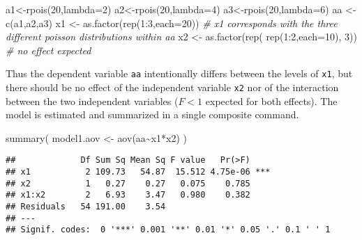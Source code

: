 \documentclass[
]{book}
\newenvironment{Shaded}{\begin{snugshade}}{\end{snugshade}}
\newcommand{\AttributeTok}[1]{\textcolor[rgb]{0.77,0.63,0.00}{#1}}
\newcommand{\CommentTok}[1]{\textcolor[rgb]{0.56,0.35,0.01}{\textit{#1}}}
\newcommand{\DecValTok}[1]{\textcolor[rgb]{0.00,0.00,0.81}{#1}}
\newcommand{\FunctionTok}[1]{\textcolor[rgb]{0.00,0.00,0.00}{#1}}
\newcommand{\NormalTok}[1]{#1}
\newcommand{\OtherTok}[1]{\textcolor[rgb]{0.56,0.35,0.01}{#1}}
\newcommand{\SpecialCharTok}[1]{\textcolor[rgb]{0.00,0.00,0.00}{#1}}
\begin{document}
\begin{Shaded}
\begin{Highlighting}[]
\NormalTok{a1}\OtherTok{\textless{}{-}}\FunctionTok{rpois}\NormalTok{(}\DecValTok{20}\NormalTok{,}\AttributeTok{lambda=}\DecValTok{2}\NormalTok{)}
\NormalTok{a2}\OtherTok{\textless{}{-}}\FunctionTok{rpois}\NormalTok{(}\DecValTok{20}\NormalTok{,}\AttributeTok{lambda=}\DecValTok{4}\NormalTok{) }
\NormalTok{a3}\OtherTok{\textless{}{-}}\FunctionTok{rpois}\NormalTok{(}\DecValTok{20}\NormalTok{,}\AttributeTok{lambda=}\DecValTok{6}\NormalTok{) }
\NormalTok{aa }\OtherTok{\textless{}{-}} \FunctionTok{c}\NormalTok{(a1,a2,a3) }
\NormalTok{x1 }\OtherTok{\textless{}{-}} \FunctionTok{as.factor}\NormalTok{(}\FunctionTok{rep}\NormalTok{(}\DecValTok{1}\SpecialCharTok{:}\DecValTok{3}\NormalTok{,}\AttributeTok{each=}\DecValTok{20}\NormalTok{)) }
\CommentTok{\# x1 corresponds with the three different poisson distributions within aa}
\NormalTok{x2 }\OtherTok{\textless{}{-}} \FunctionTok{as.factor}\NormalTok{(}\FunctionTok{rep}\NormalTok{( }\FunctionTok{rep}\NormalTok{(}\DecValTok{1}\SpecialCharTok{:}\DecValTok{2}\NormalTok{,}\AttributeTok{each=}\DecValTok{10}\NormalTok{), }\DecValTok{3}\NormalTok{)) }\CommentTok{\# no effect expected}
\end{Highlighting}
\end{Shaded}

Thus the dependent variable \texttt{aa} intentionally differs between the levels of \texttt{x1}, but there should be no effect of the independent variable \texttt{x2} nor of the interaction between the two independent variables (\(F<1\) expected for both effects). The model is estimated and summarized in a single composite command.

\begin{Shaded}
\begin{Highlighting}[]
\FunctionTok{summary}\NormalTok{( model1.aov }\OtherTok{\textless{}{-}} \FunctionTok{aov}\NormalTok{(aa}\SpecialCharTok{\textasciitilde{}}\NormalTok{x1}\SpecialCharTok{*}\NormalTok{x2) )}
\end{Highlighting}
\end{Shaded}

\begin{verbatim}
##             Df Sum Sq Mean Sq F value   Pr(>F)    
## x1           2 109.73   54.87  15.512 4.75e-06 ***
## x2           1   0.27    0.27   0.075    0.785    
## x1:x2        2   6.93    3.47   0.980    0.382    
## Residuals   54 191.00    3.54                     
## ---
## Signif. codes:  0 '***' 0.001 '**' 0.01 '*' 0.05 '.' 0.1 ' ' 1
\end{verbatim}
\end{document}
